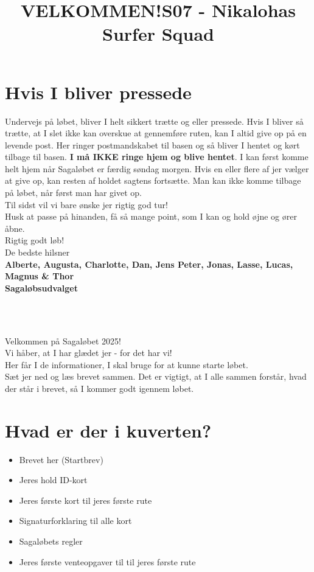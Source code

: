 \section{Hvis I bliver pressede}
Undervejs på løbet, bliver I helt sikkert trætte og eller pressede. Hvis I bliver så trætte, at I slet ikke kan overskue at gennemføre ruten, kan I altid give op på en levende post. Her ringer postmandskabet til basen og så bliver I hentet og kørt tilbage til basen. \textbf{I må IKKE ringe hjem og blive hentet}. I kan først komme helt hjem når Sagaløbet er færdig søndag morgen. Hvis en eller flere af jer vælger at give op, kan resten af holdet sagtens fortsætte. Man kan ikke komme tilbage på løbet, når først man har givet op.\\
\newline
Til sidst vil vi bare ønske jer rigtig god tur!\\
Husk at passe på hinanden, få så mange point, som I kan og hold øjne og ører åbne.\\
\newline
Rigtig godt løb!\\
\newline
\textcolor{søblå}{De bedste hilsner}\\
\textcolor{natblå}{\textbf{Alberte, Augusta, Charlotte, Dan, Jens Peter, Jonas, Lasse, Lucas, Magnus \& Thor}}\\
\textcolor{natblå}{\textbf{Sagaløbsudvalget}}\\
\newpage
\title{VELKOMMEN!}\\
\newline
\title{\textcolor{flammefarvet}{S07 - Nikalohas Surfer Squad }}\\
\newline
Velkommen på Sagaløbet 2025!\\
Vi håber, at I har glædet jer - for det har vi!\\
Her får I de informationer, I skal bruge for at kunne starte løbet.\\
Sæt jer ned og læs brevet sammen. Det er vigtigt, at I alle sammen forstår, hvad der står i brevet, så I kommer godt igennem løbet.
\section{Hvad er der i kuverten?}
\begin{itemize}
    \item Brevet her (Startbrev)
    \item Jeres hold ID-kort
    \item Jeres første kort til jeres første rute
    \item Signaturforklaring til alle kort
    \item Sagaløbets regler
    \item Jeres første venteopgaver til til jeres første rute
\end{itemize}
